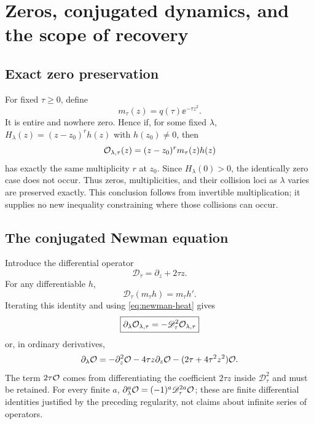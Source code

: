 \section{Zeros, conjugated dynamics, and the scope of recovery}
\label{sec:consequences}

\subsection{Exact zero preservation}

For fixed $\tau\ge0$, define
\begin{equation}
 m_\tau(z)=q(\tau)\ee^{-\tau z^2}.
 \label{eq:multiplier}
\end{equation}
It is entire and nowhere zero. Hence if, for some fixed $\lambda$,
$H_\lambda(z)=(z-z_0)^r h(z)$ with $h(z_0)\ne0$, then
\begin{equation*}
 \mathcal O_{\lambda,\tau}(z)=(z-z_0)^r m_\tau(z)h(z)
\end{equation*}
has exactly the same multiplicity $r$ at $z_0$. Since $H_\lambda(0)>0$,
the identically zero case does not occur. Thus zeros, multiplicities,
and their collision loci as $\lambda$ varies are preserved exactly.
This conclusion follows from invertible multiplication; it supplies
no new inequality constraining where those collisions can occur.

\subsection{The conjugated Newman equation}

Introduce the differential operator
\begin{equation}
 \mathscr D_\tau=\partial_z+2\tau z.
 \label{eq:covariant-derivative}
\end{equation}
For any differentiable $h$,
\begin{equation}
 \mathscr D_\tau(m_\tau h)=m_\tau h'.
 \label{eq:conjugation}
\end{equation}
Iterating this identity and using \eqref{eq:newman-heat} gives
\begin{equation}
 \boxed{\partial_\lambda\mathcal O_{\lambda,\tau}
       =-\mathscr D_\tau^2\mathcal O_{\lambda,\tau}}
 \label{eq:conjugated-heat}
\end{equation}
or, in ordinary derivatives,
\begin{equation}
 \partial_\lambda\mathcal O
 =-\partial_z^2\mathcal O-4\tau z\partial_z\mathcal O
                 -(2\tau+4\tau^2z^2)\mathcal O.
 \label{eq:conjugated-heat-expanded}
\end{equation}
The term $2\tau\mathcal O$ comes from differentiating the coefficient
$2\tau z$ inside $\mathscr D_\tau^2$ and must be retained.
For every finite $a$,
$\partial_\lambda^a\mathcal O=(-1)^a\mathscr D_\tau^{2a}\mathcal O$;
these are finite differential identities justified by the preceding
regularity, not claims about infinite series of operators.

